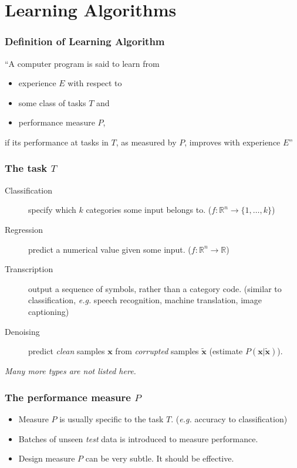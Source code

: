 \documentclass{beamer}
\begin{document}
\section{Learning Algorithms}

\begin{frame}
  \frametitle{Definition of Learning Algorithm}

  ``A computer program is said to learn from
  \begin{itemize}
    \item[\checkmark] experience $E$ with respect to
    \item[\checkmark] some class of tasks $T$ and
    \item[\checkmark] performance measure $P$,
  \end{itemize}
  if its performance at tasks in $T$, as measured by $P$, improves with experience $E$'' \cite{mitchelltm1997}

\end{frame}

\begin{frame}
  \frametitle{The task $T$}

  \begin{description}
    \item[Classification] specify which $k$ categories some input belongs to. ($f: \mathbb{R}^{n}\rightarrow \{1,\ldots,k\}$)
    \item[Regression] predict a numerical value given some input. ($f: \mathbb{R}^{n}\rightarrow\mathbb{R}$)
    \item[Transcription] output a sequence of symbols, rather than a category code. (similar to classification, \emph{e.g.} speech recognition, machine translation, image captioning)
    \item[Denoising] predict \emph{clean} samples $\bm{x}$ from \emph{corrupted} samples $\tilde{\bm{x}}$ (estimate $P(\bm{x}|\tilde{\bm{x}})$).
  \end{description}

\small
\emph{Many more types are not listed here.}
\end{frame}

\begin{frame}
  \frametitle{The performance measure $P$}

  \begin{itemize}
    \item[\ding{226}] Measure $P$ is usually specific to the task $T$. (\emph{e.g.} accuracy to classification)
    \item[\ding{226}] Batches of unseen \emph{test} data is introduced to measure performance.
    \item[\ding{226}] Design measure $P$ can be very subtle. It should be effective.
  \end{itemize}
\end{frame}
\end{document}
